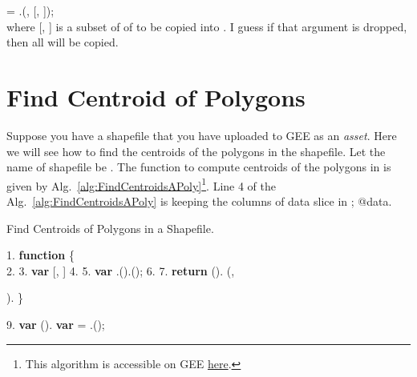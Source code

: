  = .(, [, ]);\\

\noindent where [, ] 
is a subset of  of  
to be copied into .
I guess if that argument is dropped, then
all  will be copied.

\section{Find Centroid of Polygons}
Suppose you have a shapefile that you have
uploaded to GEE as an \emph{asset}. Here
we will see how to find the centroids of
the polygons in the shapefile.
Let the name of shapefile be .
The function to compute centroids of the
polygons in  is
given by Alg.~\ref{alg:FindCentroidsAPoly}\footnote{This algorithm is 
accessible on GEE \href{https://code.earthengine.google.com/df1685205d4fbfd8def0efb12a75f8e4}{here}.}.
Line 4 of the Alg.~\ref{alg:FindCentroidsAPoly}
is keeping the columns of data slice in ; 
@data.
\begin{tcolorbox}
  \begin{algorithm}[H]
  \label{alg:FindCentroidsAPoly}
   \caption{Find Centroids of Polygons in a Shapefile.}
\SetAlgoLined
1. \textbf{function}  \{ \\
  \vspace{.1in}
\hspace{.2in} 2. {\color{ForestGreen}{// Keep this list of properties.}}\;
\hspace{.2in} 3. \textbf{var}  [, ] \;
  \vspace{.2in}
\hspace{.2in} 4. {\color{ForestGreen}{// Get the centroid of the feature's geometry.}}\;
\hspace{.2in} 5. \textbf{var}  
.().(); \;
  \vspace{.2in}
\hspace{.2in} 6. 
{}\;
\hspace{.2in} 7. \textbf{return}
().
     (,
 
  \hspace{2.8in}). \}
  
  \vspace{.1in}
9. \textbf{var}  (). \textbf{var}  = .();
\end{algorithm}
\end{tcolorbox}

